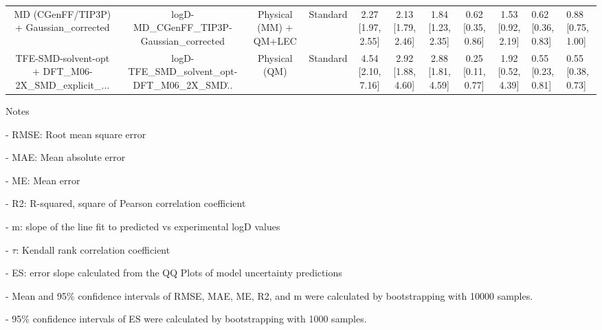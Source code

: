 \documentclass{article}
\begin{document}
\begin{center}
\begin{longtable}{|ccccccccc|}
            MD (CGenFF/TIP3P) + Gaussian_corrected &         logD-MD\_CGenFF\_TIP3P-Gaussian\_corrected &  Physical (MM) + QM+LEC &   Standard &  2.27 [1.97, 2.55] &  2.13 [1.79, 2.46] &     1.84 [1.23, 2.35] &  0.62 [0.35, 0.86] &  1.53 [0.92, 2.19] &   0.62 [0.36, 0.83] &   0.88 [0.75, 1.00] \\
 TFE-SMD-solvent-opt + DFT_M06-2X_SMD_explicit_... &  logD-TFE\_SMD\_solvent\_opt-DFT\_M06\_2X\_SMD\... &           Physical (QM) &   Standard &  4.54 [2.10, 7.16] &  2.92 [1.88, 4.60] &     2.88 [1.81, 4.59] &  0.25 [0.11, 0.77] &  1.92 [0.52, 4.39] &   0.55 [0.23, 0.81] &   0.55 [0.38, 0.73] \\
\end{longtable}
\end{center}

Notes

- RMSE: Root mean square error

- MAE: Mean absolute error

- ME: Mean error

- R2: R-squared, square of Pearson correlation coefficient

- m: slope of the line fit to predicted vs experimental logD values

- $\tau$:  Kendall rank correlation coefficient

- ES: error slope calculated from the QQ Plots of model uncertainty predictions

- Mean and 95\% confidence intervals of RMSE, MAE, ME, R2, and m were calculated by bootstrapping with 10000 samples.

- 95\% confidence intervals of ES were calculated by bootstrapping with 1000 samples.\end{document}
\end{document}

